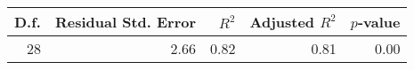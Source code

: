 \begin{tabular}{rrrrr}
  \hline
D.f. & Residual Std. Error & $R^2$ & Adjusted $R^2$ & $p$-value \\ 
  \hline
 28 & 2.66 & 0.82 & 0.81 & 0.00 \\ 
   \hline
\end{tabular}
